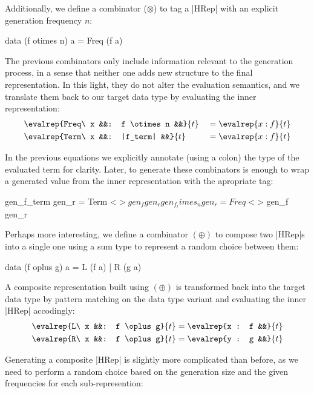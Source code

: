 Additionally, we define a combinator ($\otimes$) to tag a |HRep| with an
explicit generation frequency $n$:

\begin{code}
data (f otimes n) a = Freq (f a)
\end{code}

The previous combinators only include information relevant to the generation
process, in a sense that neither one adds new structure to the final
representation.
%
In this light, they do not alter the evaluation semantics, and we translate them
back to our target data type by evaluating the inner representation:
%
\begin{alignat*}{4}
  &\evalrep{Freq\ x &&: f \otimes n &&}{t} &&= \evalrep{x : f}{t} \\
  &\evalrep{Term\ x &&: |f_term|    &&}{t} &&= \evalrep{x : f}{t}
\end{alignat*}

In the previous equations we explicitly annotate (using a colon) the type of the
evaluated term for clarity.
%
Later, to generate these combinators is enough to wrap a generated value from
the inner representation with the apropriate tag:

\begin{code}
gen_f_term     gen_r  = Term  <$> gen_f gen_r
gen_f_times_n  gen_r  = Freq  <$> gen_f gen_r
\end{code}


Perhaps more interesting, we define a combinator $(\oplus)$ to compose two
|HRep|s into a single one using a sum type to represent a random choice between
them:

\begin{code}
data (f oplus g) a = L (f a) | R (g a)
\end{code}

A composite representation built using $(\oplus)$ is transformed back into the
target data type by pattern matching on the data type variant and evaluating the
inner |HRep| accodingly:
%
\begin{alignat*}{3}
  &\evalrep{L\ x &&: f \oplus g}{t} = \evalrep{x : f &&}{t} \\
  &\evalrep{R\ x &&: f \oplus g}{t} = \evalrep{y : g &&}{t}
\end{alignat*}

Generating a composite |HRep| is slightly more complicated than before, as we
need to perform a random choice based on the generation size and the given
frequencies for each sub-represention:

